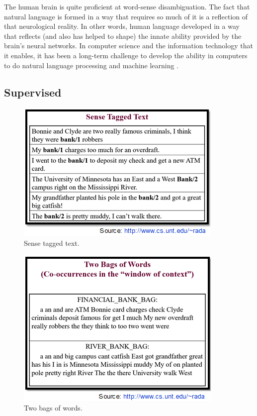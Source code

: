 The human brain is quite proficient at word-sense disambiguation. The fact that natural language is formed in a way that requires so much of it is a reflection of that neurological reality. In other words, human language developed in a way that reflects (and also has helped to shape) the innate ability provided by the brain's neural networks. In computer science and the information technology that it enables, it has been a long-term challenge to develop the ability in computers to do natural language processing and machine learning \cite{TunThuraThet2010}.

\subsection*{Supervised}

\begin{figure}[tbh]
	\begin{center}
		\includegraphics[width=\columnwidth]{union(sup1)}
	\end{center}
	\caption{Sense tagged text.}
\end{figure}
\begin{figure}[tbh]
	\begin{center}
		\includegraphics[width=\columnwidth]{union(sup2)}
	\end{center}
	\caption{Two bags of words.}
\end{figure}
